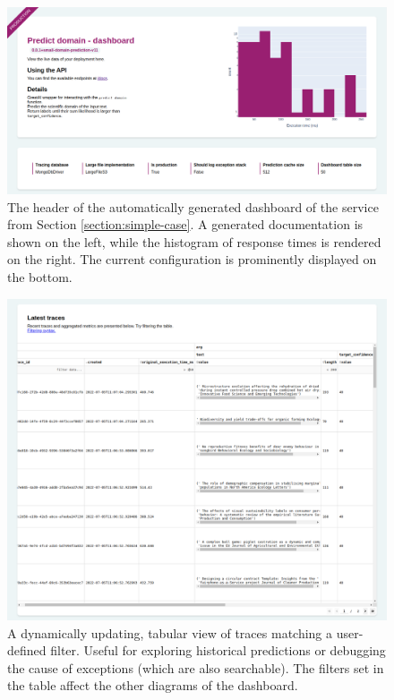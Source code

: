 \begin{figure}
    \centering
    \includegraphics[width=1\linewidth]{figures/greatai-header.png}
    \captionsetup{width=.9\linewidth}
    \caption{The header of the automatically generated dashboard of the service from Section \ref{section:simple-case}. A generated documentation is shown on the left, while the histogram of response times is rendered on the right. The current configuration is prominently displayed on the bottom.}
    \label{fig:greatai-header}
\end{figure}

\begin{figure}
    \centering
    \includegraphics[width=1\textwidth]{figures/greatai-table.png}
    \captionsetup{width=.9\linewidth}
    \caption{A dynamically updating, tabular view of traces matching a user-defined filter. Useful for exploring historical predictions or debugging the cause of exceptions (which are also searchable). The filters set in the table affect the other diagrams of the dashboard.}
    \label{fig:greatai-table}
\end{figure}

